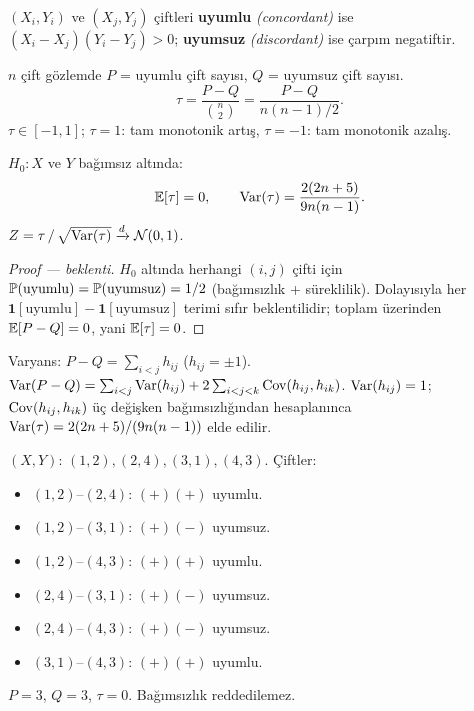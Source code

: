 \begin{tanim}\label{def:uyumlu_cift}
$(X_i,Y_i)$ ve $(X_j,Y_j)$ çiftleri \textbf{uyumlu} \emph{(concordant)} ise $(X_i-X_j)(Y_i-Y_j)>0$; \textbf{uyumsuz} \emph{(discordant)} ise çarpım negatiftir.
\end{tanim}

\begin{tanim}\label{def:kendall_tau}
$n$ çift gözlemde $P$ = uyumlu çift sayısı, $Q$ = uyumsuz çift sayısı.
\[
  \tau = \frac{P - Q}{\binom{n}{2}} = \frac{P-Q}{n(n-1)/2}.
\]
$\tau\in[-1,1]$; $\tau=1$: tam monotonik artış, $\tau=-1$: tam monotonik azalış.
\end{tanim}

\begin{teorem}\label{thm:kendall_asimptotik}
$H_0: X$ ve $Y$ bağımsız altında:
\[
  \mathbb{E}[\tau] = 0, \qquad \operatorname{Var}(\tau) = \frac{2(2n+5)}{9n(n-1)}.
\]
$Z = \tau\,/\,\sqrt{\operatorname{Var}(\tau)} \xrightarrow{d} \mathcal{N}(0,1)$.
\end{teorem}

\begin{proof}[Proof --- beklenti]
$H_0$ altında herhangi $(i,j)$ çifti için $\mathbb{P}(\text{uyumlu})=\mathbb{P}(\text{uyumsuz})=1/2$ (bağımsızlık + süreklilik). Dolayısıyla her $\mathbf{1}[\text{uyumlu}]-\mathbf{1}[\text{uyumsuz}]$ terimi sıfır beklentilidir; toplam üzerinden $\mathbb{E}[P-Q]=0$, yani $\mathbb{E}[\tau]=0$.
\end{proof}

\begin{ispatiskele}
Varyans: $P-Q = \sum_{i<j} h_{ij}$ ($h_{ij}=\pm1$). $\operatorname{Var}(P-Q)=\sum_{i<j}\operatorname{Var}(h_{ij})+2\sum_{i<j<k}\operatorname{Cov}(h_{ij},h_{ik})$. $\operatorname{Var}(h_{ij})=1$; $\operatorname{Cov}(h_{ij},h_{ik})$ üç değişken bağımsızlığından hesaplanınca $\operatorname{Var}(\tau)=2(2n+5)/(9n(n-1))$ elde edilir.
\end{ispatiskele}

\begin{ornek}
$(X,Y)$: $(1,2),(2,4),(3,1),(4,3)$. Çiftler:
\begin{itemize}
  \item $(1,2)$--$(2,4)$: $(+)(+)$ uyumlu.
  \item $(1,2)$--$(3,1)$: $(+)(-)$ uyumsuz.
  \item $(1,2)$--$(4,3)$: $(+)(+)$ uyumlu.
  \item $(2,4)$--$(3,1)$: $(+)(-)$ uyumsuz.
  \item $(2,4)$--$(4,3)$: $(+)(-)$ uyumsuz.
  \item $(3,1)$--$(4,3)$: $(+)(+)$ uyumlu.
\end{itemize}
$P=3$, $Q=3$, $\tau=0$. Bağımsızlık reddedilemez.
\end{ornek}


